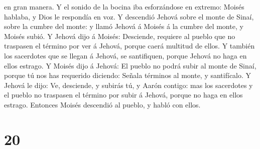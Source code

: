 en gran manera.  Y el sonido de la bocina iba esforzándose
en extremo: Moisés hablaba, y Dios le respondía en voz.  Y
descendió Jehová sobre el monte de Sinaí, sobre la cumbre del monte: y
llamó Jehová á Moisés á la cumbre del monte, y Moisés subió.
 Y Jehová dijo á Moisés: Desciende, requiere al pueblo que
no traspasen el término por ver á Jehová, porque caerá multitud de
ellos.  Y también los sacerdotes que se llegan á Jehová, se
santifiquen, porque Jehová no haga en ellos estrago.  Y
Moisés dijo á Jehová: El pueblo no podrá subir al monte de Sinaí, porque
tú nos has requerido diciendo: Señala términos al monte, y santifícalo.
 Y Jehová le dijo: Ve, desciende, y subirás tú, y Aarón
contigo: mas los sacerdotes y el pueblo no traspasen el término por
subir á Jehová, porque no haga en ellos estrago.  Entonces
Moisés descendió al pueblo, y habló con ellos.

\hypertarget{section-19}{%
\section{20}\label{section-19}}

